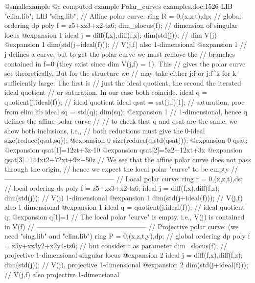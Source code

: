 @smallexample
@c computed example Polar_curves examples.doc:1526 
  LIB "elim.lib";
  LIB "sing.lib";
  // Affine polar curve:
  ring R = 0,(x,z,t),dp;              // global ordering dp
  poly f = z5+xz3+x2-tz6;
  dim_slocus(f);                      // dimension of singular locus
@expansion{} 1
  ideal j = diff(f,x),diff(f,z);
  dim(std(j));                        // dim V(j)
@expansion{} 1
  dim(std(j+ideal(f)));               // V(j,f) also 1-dimensional
@expansion{} 1
  // j defines a curve, but to get the polar curve we must remove the
  // branches contained in f=0 (they exist since dim V(j,f) = 1). This
  // gives the polar curve set theoretically. But for the structure we
  // may take either j:f or j:f^k for k sufficiently large. The first is
  // just the ideal quotient, the second the iterated ideal quotient
  // or saturation. In our case both coincide.
  ideal q = quotient(j,ideal(f));     // ideal quotient
  ideal qsat = sat(j,f)[1];           // saturation, proc from elim.lib
  ideal sq = std(q);
  dim(sq);
@expansion{} 1
  // 1-dimensional, hence q defines the affine polar curve
  //
  // to check that q and qsat are the same, we show both inclusions, i.e.,
  // both reductions must give the 0-ideal
  size(reduce(qsat,sq));
@expansion{} 0
  size(reduce(q,std(qsat)));
@expansion{} 0
  qsat;
@expansion{} qsat[1]=12zt+3z-10
@expansion{} qsat[2]=5z2+12xt+3x
@expansion{} qsat[3]=144xt2+72xt+9x+50z
  // We see that the affine polar curve does not pass through the origin,
  // hence we expect the local polar "curve" to be empty
  // ------------------------------------------------
  // Local polar curve:
  ring r = 0,(x,z,t),ds;              // local ordering ds
  poly f = z5+xz3+x2-tz6;
  ideal j = diff(f,x),diff(f,z);
  dim(std(j));                        // V(j) 1-dimensional
@expansion{} 1
  dim(std(j+ideal(f)));               // V(j,f) also 1-dimensional
@expansion{} 1
  ideal q = quotient(j,ideal(f));     // ideal quotient
  q;
@expansion{} q[1]=1
  // The local polar "curve" is empty, i.e., V(j) is contained in V(f)
  // ------------------------------------------------
  // Projective polar curve: (we need "sing.lib" and "elim.lib")
  ring P = 0,(x,z,t,y),dp;            // global ordering dp
  poly f = z5y+xz3y2+x2y4-tz6;
                                      // but consider t as parameter
  dim_slocus(f);              // projective 1-dimensional singular locus
@expansion{} 2
  ideal j = diff(f,x),diff(f,z);
  dim(std(j));                        // V(j), projective 1-dimensional
@expansion{} 2
  dim(std(j+ideal(f)));               // V(j,f) also projective 1-dimensional
